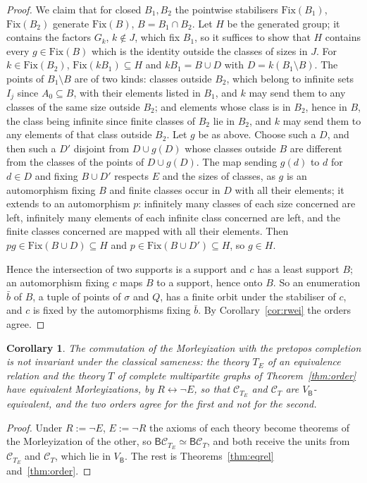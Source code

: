 \documentclass[11pt]{amsart}
\newtheorem{cor}[thm]{Corollary}
\theoremstyle{definition}
\newcommand{\BB}{\mathsf B}
\newcommand{\cC}{\mathcal C}
\begin{document}
\begin{proof}
We claim that for closed $B_1,B_2$ the pointwise stabilisers
$\mathrm{Fix}(B_1)$, $\mathrm{Fix}(B_2)$ generate $\mathrm{Fix}(B)$,
$B=B_1\cap B_2$. Let $H$ be the generated group; it contains the
factors $G_k$, $k\notin J$, which fix $B_1$, so it suffices to show
that $H$ contains every $g\in\mathrm{Fix}(B)$ which is the identity
outside the classes of sizes in $J$. For
$k\in\mathrm{Fix}(B_2)$, $\mathrm{Fix}(kB_1)\subseteq H$ and $kB_1=B\cup
D$ with $D=k(B_1\setminus B)$. The points of $B_1\setminus B$ are of two
kinds: classes outside $B_2$, which belong to infinite sets $I_j$ since
$A_0\subseteq B$, with their elements listed in $B_1$, and $k$ may send
them to any classes of the same size outside $B_2$; and elements whose
class is in $B_2$, hence in $B$, the class being infinite since finite
classes of $B_2$ lie in $B_2$, and $k$ may send them to any elements of
that class outside $B_2$. Let $g$ be as above. Choose such a $D$,
and then such a $D'$ disjoint from $D\cup g(D)$ whose classes outside
$B$ are different from the classes of the points of $D\cup g(D)$. The
map sending $g(d)$ to $d$ for $d\in D$ and fixing $B\cup D'$ respects
$E$ and the sizes of classes, as $g$ is an automorphism fixing $B$ and
finite classes occur in $D$ with all their elements; it extends to an
automorphism $p$: infinitely many classes of each size concerned are
left, infinitely many elements of each infinite class concerned are
left, and the finite classes concerned are mapped with all their
elements. Then
$pg\in\mathrm{Fix}(B\cup D)\subseteq H$ and $p\in\mathrm{Fix}(B\cup D')
\subseteq H$, so $g\in H$.

Hence the intersection of two supports is a support and $c$ has a least
support $B$; an automorphism fixing $c$ maps $B$ to a support, hence
onto $B$. So an enumeration $\bar b$ of $B$, a tuple of points of
$\sigma$ and $Q$, has a finite orbit under the stabiliser of $c$, and
$c$ is fixed by the automorphisms fixing $\bar b$. By
Corollary~\ref{cor:rwei} the orders agree.
\end{proof}

\begin{cor}\label{cor:notclassical}
The commutation of the Morleyization with the pretopos completion is
not invariant under the classical sameness: the theory $T_E$ of an
equivalence relation and the theory $T$ of complete multipartite graphs
of Theorem~\ref{thm:order} have equivalent Morleyizations, by
$R\leftrightarrow\neg E$, so that $\cC_{T_E}$ and $\cC_T$ are
$V_\BB$-equivalent, and the two orders agree for the first and not for
the second.
\end{cor}
\begin{proof}
Under $R:=\neg E$, $E:=\neg R$ the axioms of each theory become
theorems of the Morleyization of the other, so $\BB\cC_{T_E}\simeq\BB
\cC_T$, and both receive the units from $\cC_{T_E}$ and $\cC_T$, which
lie in $V_\BB$. The rest is Theorems~\ref{thm:eqrel} and~\ref{thm:order}.
\end{proof}
\end{document}
